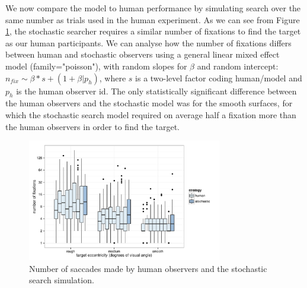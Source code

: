 \documentclass[man]{apa6}
\begin{document}
We now compare the model to human performance by simulating search over the same number as trials used in the human experiment. As we can see from Figure \ref{fig:numFixHumanModel}, the stochastic searcher requires a similar number of fixations to find the target as our human participants. We can analyse how the number of fixations differs between human and stochastic observers using a general linear mixed effect model (family="poisson"), with random slopes for $\beta$ and random intercept: $n_{fix} \sim \beta * s + (1+\beta | p_h)$, where $s$ is a two-level factor coding human/model and $p_h$ is the human observer id. The only statistically significant difference between the human observers and the stochastic model was for the smooth surfaces, for which the stochastic search model required on average half a fixation more than the human observers in order to find the target. 

\begin{figure}
	\centering
	\includegraphics[width=8.5cm]{fig/modelComp/numFixHumanModel.pdf}
	\caption{Number of saccades made by human observers and the stochastic search simulation.} 
	\label{fig:numFixHumanModel}
\end{figure}

\end{document}
